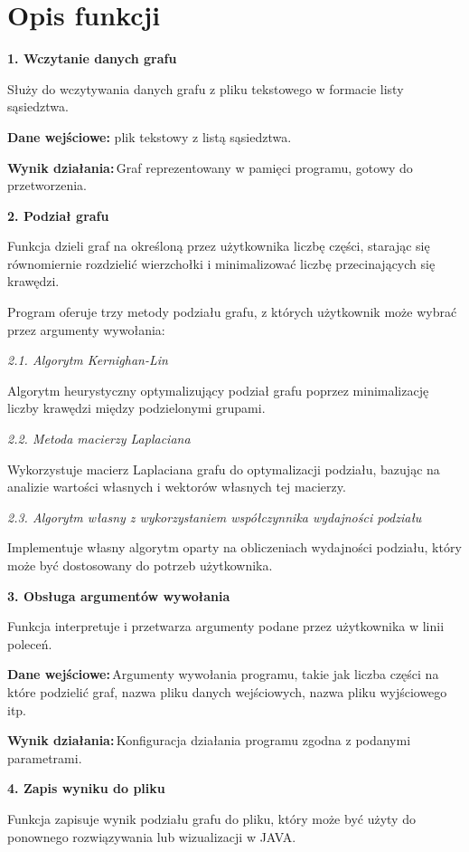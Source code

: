 \documentclass[a4paper,12pt]{article}
\begin{document}
\section{Opis funkcji}

\textbf{ 1. Wczytanie danych grafu} 

Służy do wczytywania danych grafu z pliku tekstowego w formacie listy sąsiedztwa. 

\textbf{Dane wejściowe:} plik tekstowy z listą sąsiedztwa. 

\textbf{Wynik działania:} Graf reprezentowany w pamięci programu, gotowy do przetworzenia. 

\textbf{2. Podział grafu} 

Funkcja dzieli graf na określoną przez użytkownika liczbę części, starając się równomiernie rozdzielić wierzchołki i minimalizować liczbę przecinających się krawędzi. 

Program oferuje trzy metody podziału grafu, z których użytkownik może wybrać przez argumenty wywołania: 

\textit{2.1. Algorytm Kernighan-Lin} 

Algorytm heurystyczny optymalizujący podział grafu poprzez minimalizację liczby krawędzi między podzielonymi grupami. 

\textit{2.2. Metoda macierzy Laplaciana} 

Wykorzystuje macierz Laplaciana grafu do optymalizacji podziału, bazując na analizie wartości własnych i wektorów własnych tej macierzy. 

\textit{2.3. Algorytm własny z wykorzystaniem współczynnika wydajności podziału} 

Implementuje własny algorytm oparty na obliczeniach wydajności podziału, który może być dostosowany do potrzeb użytkownika. 

\textbf{3. Obsługa argumentów wywołania} 

Funkcja interpretuje i przetwarza argumenty podane przez użytkownika w linii poleceń. 

\textbf{Dane wejściowe:} Argumenty wywołania programu, takie jak liczba części na które podzielić graf, nazwa pliku danych wejściowych, nazwa pliku wyjściowego itp. 

\textbf{Wynik działania:} Konfiguracja działania programu zgodna z podanymi parametrami. 

\textbf{4. Zapis wyniku do pliku} 

Funkcja zapisuje wynik podziału grafu do pliku, który może być użyty do ponownego rozwiązywania lub wizualizacji w JAVA. 
\end{document}
